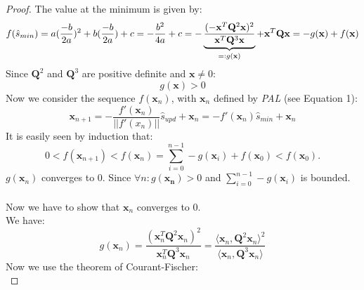 \begin{proof}
\noindent The value at the minimum is given by: 
\begin{equation}
f(\hat{s}_{min})\\= a(\frac{-b}{2a})^2+b(\frac{-b}{2a})+c\\=-\frac{b^2}{4a}+c\\
=-\underbrace{\frac{(-\mathbf{x}^T\mathbf{Q}^2\mathbf{x})^2}{\mathbf{x}^T\mathbf{Q}^3\mathbf{x}}}_{=:g(\mathbf{x})}+\mathbf{x}^T\mathbf{Q}\mathbf{x}
\\=-g(\mathbf{x})+f(\mathbf{x}) \\
\end{equation}
Since $\mathbf{Q}^2$ and $\mathbf{Q}^3$ are positive definite and $\mathbf{x}\neq 0$: \begin{equation}g(\mathbf{x})>0\end{equation}
Now we consider the sequence $f(\mathbf{x}_n)$, with $\mathbf{x}_n$ defined by \textit{PAL} (see Equation 1): \\
\begin{equation}
\mathbf{x}_{n+1}=-\frac{f'(\mathbf{x}_n)}{||f'(x_n)||}\hat{s}_{upd}+\mathbf{x}_n= -f'(\mathbf{x}_n)\hat{s}_{min}+\mathbf{x}_n
\end{equation}
 It is easily seen by induction that:
 \begin{equation}
  0<f(\mathbf{x}_{n+1})<f(\mathbf{x}_{n})=\sum\limits_{i=0}^{n-1} -g(\mathbf{x}_i) +f(\mathbf{x}_0)< f(\mathbf{x}_0). 
\end{equation}
  $g(\mathbf{x}_{n})$ converges to 0. Since $\forall n:g(\mathbf{x_n})>0$ and $\sum\limits_{i=0}^{n-1} -g(\mathbf{x}_i)$ is bounded. \\
  \\ Now we have to show that $\mathbf{x}_n$ converges to 0.
 \\ We have:
  \begin{equation}
  g(\mathbf{x}_n)=\frac{(\mathbf{x}_n^T\mathbf{Q}^2\mathbf{x}_n)^2}{\mathbf{x}_n^T\mathbf{Q}^3\mathbf{x}_n}=\frac{\langle\mathbf{x}_n,\mathbf{Q}^2\mathbf{x}_n\rangle^2}{\langle\mathbf{x}_n,\mathbf{Q}^3\mathbf{x}_n\rangle}
  \end{equation}
 Now we use the theorem of Courant-Fischer:
   \begin{equation}

\end{equation}
\end{proof}
